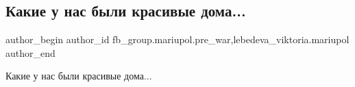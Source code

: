  
 
 
 
 

\subsection{Какие у нас были красивые дома...}
\label{sec:27_02_2023.fb.fb_group.mariupol.pre_war.1.kakie_u_nas_bili_kra}
 
\ifcmt
 author_begin
   author_id fb_group.mariupol.pre_war,lebedeva_viktoria.mariupol
 author_end
\fi

Какие у нас были красивые дома...


